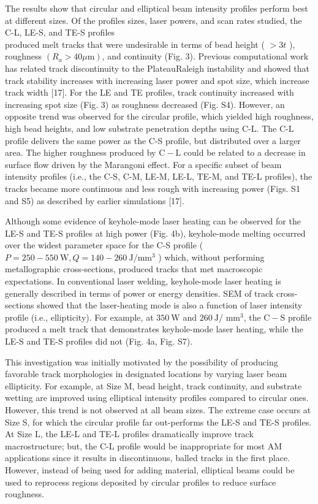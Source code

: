 \documentclass[10pt]{article}
\begin{document}
The results show that circular and elliptical beam intensity profiles perform best at different sizes. Of the profiles sizes, laser powers, and scan rates studied, the C-L, LE-S, and TE-S profiles\\
produced melt tracks that were undesirable in terms of bead height ( $>3 t$ ), roughness $\left(R_{a}>40 \mu \mathrm{m}\right)$, and continuity (Fig. 3). Previous computational work has related track discontinuity to the PlateauRaleigh instability and showed that track stability increases with increasing laser power and spot size, which increase track width [17]. For the LE and TE profiles, track continuity increased with increasing spot size (Fig. 3) as roughness decreased (Fig. S4). However, an opposite trend was observed for the circular profile, which yielded high roughness, high bead heights, and low substrate penetration depths using C-L. The C-L profile delivers the same power as the C-S profile, but distributed over a larger area. The higher roughness produced by $\mathrm{C}-\mathrm{L}$ could be related to a decrease in surface flow driven by the Marangoni effect. For a specific subset of beam intensity profiles (i.e., the C-S, C-M, LE-M, LE-L, TE-M, and TE-L profiles), the tracks became more continuous and less rough with increasing power (Figs. S1 and S5) as described by earlier simulations [17].

Although some evidence of keyhole-mode laser heating can be observed for the LE-S and TE-S profiles at high power (Fig. 4b), keyhole-mode melting occurred over the widest parameter space for the C-S profile ( $P=250-550 \mathrm{~W}, Q=140-260 \mathrm{~J} / \mathrm{mm}^{3}$ ) which, without performing metallographic cross-sections, produced tracks that met macroscopic expectations. In conventional laser welding, keyhole-mode laser heating is generally described in terms of power or energy densities. SEM of track cross-sections showed that the laser-heating mode is also a function of laser intensity profile (i.e., ellipticity). For example, at $350 \mathrm{~W}$ and $260 \mathrm{~J} /$ $\mathrm{mm}^{3}$, the $\mathrm{C}-\mathrm{S}$ profile produced a melt track that demonstrates keyhole-mode laser heating, while the LE-S and TE-S profiles did not (Fig. 4a, Fig. S7).

This investigation was initially motivated by the possibility of producing favorable track morphologies in designated locations by varying laser beam ellipticity. For example, at Size M, bead height, track continuity, and substrate wetting are improved using elliptical intensity profiles compared to circular ones. However, this trend is not observed at all beam sizes. The extreme case occurs at Size S, for which the circular profile far out-performs the LE-S and TE-S profiles. At Size L, the LE-L and TE-L profiles dramatically improve track macrostructure; but, the C-L profile would be inappropriate for most AM applications since it results in discontinuous, balled tracks in the first place. However, instead of being used for adding material, elliptical beams could be used to reprocess regions deposited by circular profiles to reduce surface roughness.
\end{document}
